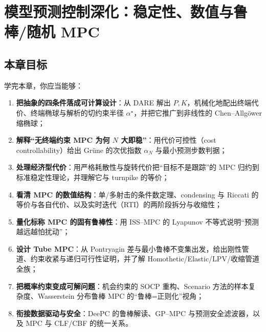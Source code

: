 \chapter{模型预测控制深化：稳定性、数值与鲁棒/随机 MPC}
\label{ch:mpc-advanced}


\section*{本章目标}
学完本章，你应当能够：
\begin{enumerate}
  \item \textbf{把抽象的四条件落成可计算设计}：从 DARE 解出 $P,K$，机械化地配出终端代价、终端椭球与解析的切约束半径 $\alpha^\star$，并把它推广到非线性的 Chen--Allgöwer 缩椭球；
  \item \textbf{解释“无终端约束 MPC 为何 $N$ 大即稳”}：用代价可控性（cost controllability）给出 Grüne 的次优指数 $\alpha_N$ 与最小预测步数判据；
  \item \textbf{处理经济型代价}：用严格耗散性与旋转代价把“目标不是跟踪”的 MPC 归约到标准稳定性理论，并理解它与 turnpike 的等价；
  \item \textbf{看清 MPC 的数值结构}：单/多射击的条件数定理、condensing 与 Riccati 的等价与各自代价、以及实时迭代（RTI）的两阶段拆分与收缩性；
  \item \textbf{量化标称 MPC 的固有鲁棒性}：用 ISS--MPC 的 Lyapunov 不等式说明“预测越远越怕扰动”；
  \item \textbf{设计 Tube MPC}：从 Pontryagin 差与最小鲁棒不变集出发，给出刚性管道、约束收紧与递归可行性证明，并了解 Homothetic/Elastic/LPV/收缩管道全族；
  \item \textbf{把概率约束变成可解问题}：机会约束的 SOCP 重构、Scenario 方法的样本复杂度、Wasserstein 分布鲁棒 MPC 的“鲁棒=正则化”视角；
  \item \textbf{衔接数据驱动与安全}：DeePC 的鲁棒解读、GP--MPC 与预测安全滤波器，以及 MPC 与 CLF/CBF 的统一关系。
\end{enumerate}

